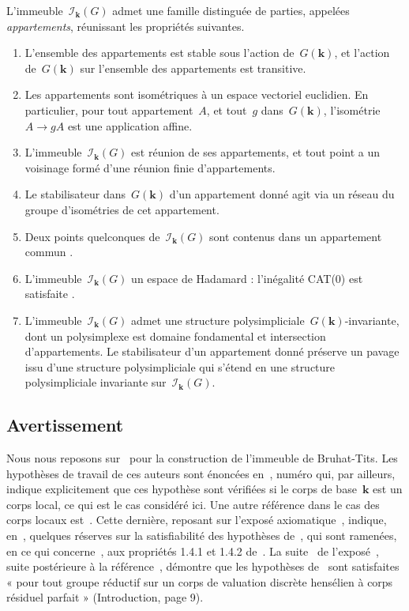 \documentclass[french]{amsart}
\newcommand{\kk}{\mathbf{k}}
\newcommand{\Ik}{\mathscr{I}_\kk}
\begin{document}
L'immeuble~$\Ik(G)$ admet une famille distinguée de parties, appelées \emph{appartements}, réunissant les propriétés suivantes.
\begin{enumerate}[label=\alph*.]
\item \label{a.} L'ensemble des appartements est stable sous l'action de~$G(\kk)$, et l'action de~$G(\kk)$ sur l'ensemble des appartements est transitive.
\item \label{b.} Les appartements sont isométriques à un espace vectoriel euclidien. En particulier, pour tout appartement~$A$, et tout~$g$ dans~$G(\kk)$, l'isométrie~$A\xrightarrow{} g A$ est une application affine.
\item \label{c.} L'immeuble~$\Ik(G)$ est réunion de ses appartements, et tout point a un voisinage formé d'une réunion finie d'appartements.
\item \label{d.} Le stabilisateur dans~$G(\kk)$ d'un appartement donné agit via un réseau du grou\-pe d'isométries de cet appartement.
\item \label{e.} Deux points quelconques de~$\Ik(G)$ sont contenus dans un appartement commun \cite[7.14.18]{BT72}.
\item \label{f.} L'immeuble~$\Ik(G)$ un espace de Hadamard : l'inégalité CAT(0) est satisfaite \cite[3.2]{BT72}.
\item \label{g.} L'immeuble~$\Ik(G)$ admet une structure polysimpliciale~$G(\kk)$-invariante, dont un polysimplexe est domaine fondamental et intersection d'appartements. Le stabilisateur d'un appartement donné préserve un pavage issu d'une structure polysimpliciale qui s'étend en une structure polysimpliciale invariante
sur~$\Ik(G)$.
\end{enumerate}

\subsection{Avertissement}
Nous nous reposons sur~\cite{RTW09} pour la construction
de l'immeuble de Bruhat-Tits. Les hypothèses de travail de ces auteurs sont
énoncées en~\cite[1.3.4]{RTW09}, numéro qui, par ailleurs, indique explicitement que
ces hypothèse sont vérifiées si le corps de base~$\kk$ est un corps local, ce qui est
le cas considéré ici. Une autre référence dans le cas des corps locaux est~\cite{Tit79}.
Cette dernière, reposant sur l'exposé axiomatique~\cite{BT72}, indique, en~\cite[1.5]{Tit79},
quelques réserves sur la satisfiabilité des hypothèses de~\cite{BT72}, qui sont ramenées,
en ce qui concerne~\cite{Tit79}, aux propriétés 1.4.1 et 1.4.2 de~\cite{Tit79}. La
suite~\cite{BT84} de l'exposé~\cite{BT72}, suite postérieure à la référence~\cite{Tit79}, démontre
que les hypothèses de~\cite{BT72} sont satisfaites « pour tout groupe réductif sur un
corps de valuation discrète hensélien à corps résiduel parfait » (Introduction,
page 9).
\end{document}
